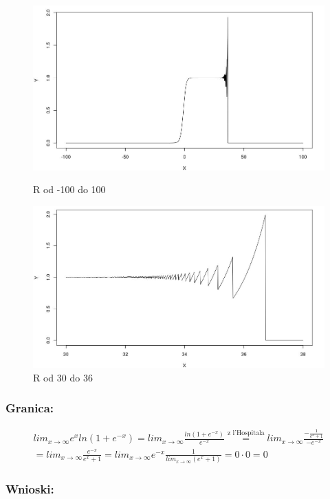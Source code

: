 \documentclass[12pt]{article}
\begin{document}
\begin{figure}[!htb]
  \includegraphics[width=\linewidth]{zad2_plot_2_2.jpg}
  \caption{R od -100 do 100}\label{fig:figure3}
\endminipage\hfill
{}
  \includegraphics[width=\linewidth]{zad2_plot_3_2.jpg}
  \caption{R od 30 do 36}\label{fig:figure4}
\endminipage
\end{figure}

\subsubsection*{Granica:}
\begin{align*}
lim_{x \to \infty} e^x ln(1+e^{-x}) = lim_{x \to \infty} \frac{ln(1+e^{-x})}{e^{-x}} \stackrel{\text{z l’Hospitala}}{=} lim_{x \to \infty} \frac{-\frac{1}{e^x + 1}}{-e^{-x}} \\
= lim_{x \to \infty} \frac{e^{-x}}{e^x + 1} = lim_{x \to \infty} e^{-x} \frac{1}{lim_{x \to \infty} (e^x + 1)} = 0 \cdot 0 = 0
\end{align*}

\subsubsection*{Wnioski:}
\end{document}
